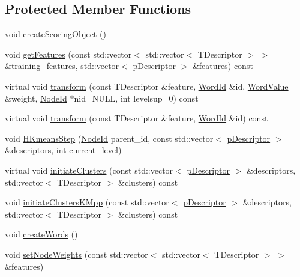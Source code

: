 \subsection*{Protected Member Functions}
\begin{DoxyCompactItemize}
\item 
void \hyperlink{classDBoW2_1_1TemplatedVocabulary_a3244d5a3d0f75ba9c9ae905c5365335d}{create\+Scoring\+Object} ()
\item 
void \hyperlink{classDBoW2_1_1TemplatedVocabulary_ae2f4fabe99ff93a9d72b4416722f1a78}{get\+Features} (const std\+::vector$<$ std\+::vector$<$ T\+Descriptor $>$ $>$ \&training\+\_\+features, std\+::vector$<$ \hyperlink{classDBoW2_1_1TemplatedVocabulary_a40913d67e369e6993c2eab80a968f829}{p\+Descriptor} $>$ \&features) const
\item 
virtual void \hyperlink{classDBoW2_1_1TemplatedVocabulary_a5af7e18ab438c3fbbb51bd9930c43444}{transform} (const T\+Descriptor \&feature, \hyperlink{namespaceDBoW2_ab1a0d3283b2d4690a383372ed20bfeb5}{Word\+Id} \&id, \hyperlink{namespaceDBoW2_a55fcd7333e591a38e96b91f41bc182f6}{Word\+Value} \&weight, \hyperlink{namespaceDBoW2_a3a0fa9c50c0df508759362d6204566f2}{Node\+Id} $\ast$nid=N\+U\+LL, int levelsup=0) const
\item 
virtual void \hyperlink{classDBoW2_1_1TemplatedVocabulary_a48a53ffe060c205e44ddd2e173eb96c4}{transform} (const T\+Descriptor \&feature, \hyperlink{namespaceDBoW2_ab1a0d3283b2d4690a383372ed20bfeb5}{Word\+Id} \&id) const
\item 
void \hyperlink{classDBoW2_1_1TemplatedVocabulary_abcbbda75df001522490774746bdb570c}{H\+Kmeans\+Step} (\hyperlink{namespaceDBoW2_a3a0fa9c50c0df508759362d6204566f2}{Node\+Id} parent\+\_\+id, const std\+::vector$<$ \hyperlink{classDBoW2_1_1TemplatedVocabulary_a40913d67e369e6993c2eab80a968f829}{p\+Descriptor} $>$ \&descriptors, int current\+\_\+level)
\item 
virtual void \hyperlink{classDBoW2_1_1TemplatedVocabulary_a052c169ea13af2e7de1baa5597f60fb7}{initiate\+Clusters} (const std\+::vector$<$ \hyperlink{classDBoW2_1_1TemplatedVocabulary_a40913d67e369e6993c2eab80a968f829}{p\+Descriptor} $>$ \&descriptors, std\+::vector$<$ T\+Descriptor $>$ \&clusters) const
\item 
void \hyperlink{classDBoW2_1_1TemplatedVocabulary_ab22e6bcfb6a1e8330a90edd732617875}{initiate\+Clusters\+K\+Mpp} (const std\+::vector$<$ \hyperlink{classDBoW2_1_1TemplatedVocabulary_a40913d67e369e6993c2eab80a968f829}{p\+Descriptor} $>$ \&descriptors, std\+::vector$<$ T\+Descriptor $>$ \&clusters) const
\item 
void \hyperlink{classDBoW2_1_1TemplatedVocabulary_a9b74d107b7dc6142cbed4e6ef44a8519}{create\+Words} ()
\item 
void \hyperlink{classDBoW2_1_1TemplatedVocabulary_a1a0a9cf4052090c041ff9442be7b22f6}{set\+Node\+Weights} (const std\+::vector$<$ std\+::vector$<$ T\+Descriptor $>$ $>$ \&features)
\end{DoxyCompactItemize}
